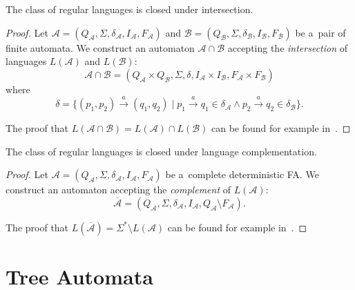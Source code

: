   \begin{theorem}
	 The class of regular languages is closed under intersection.
	\end{theorem}
	
	\begin{proof}
Let $\mathcal{A} = (Q_\mathcal{A}, \Sigma, \delta_\mathcal{A}, I_\mathcal{A},
F_\mathcal{A})$ and $\mathcal{B} = (Q_\mathcal{B}, \Sigma, \delta_\mathcal{B},
I_\mathcal{B}, F_\mathcal{B})$ be a~pair of finite automata. We construct an
automaton $\mathcal{A} \cap \mathcal{B}$ accepting the \emph{intersection} of
languages $L(\mathcal{A})$ and $L(\mathcal{B})$:
\begin{equation}
\mathcal{A} \cap \mathcal{B} = (Q_\mathcal{A} \times
Q_\mathcal{B}, \Sigma, \delta, I_\mathcal{A} \times I_\mathcal{B}, F_\mathcal{A}
\times F_\mathcal{B})
\end{equation} where 
\begin{equation}
\delta = \{(p_1, p_2) \overset{a}{\longrightarrow} (q_1, q_2) \mid p_1
\overset{a}{\longrightarrow} q_1 \in \delta_{\mathcal{A}} \wedge p_2
\overset{a}{\longrightarrow} q_2 \in \delta_{\mathcal{B}}\}.
\end{equation}

\noindent The proof that $L(\mathcal{A} \cap \mathcal{B}) = L(\mathcal{A}) \cap
L(\mathcal{B})$ can be found for example in~\cite{tin}.
\end{proof}
	
 \begin{theorem}
  The class of regular languages is closed under language complementation.
\end{theorem}
	
	\begin{proof}
Let $\mathcal{A} = (Q_\mathcal{A}, \Sigma, \delta_\mathcal{A}, I_\mathcal{A},
F_\mathcal{A})$ be a~complete deterministic FA. We construct an automaton
accepting the \emph{complement} of $L(\mathcal{A})$:
\begin{equation}
\overline{\mathcal{A}} =
(Q_\mathcal{A}, \Sigma, \delta_\mathcal{A}, I_\mathcal{A}, Q_\mathcal{A}
\setminus F_\mathcal{A}).
\end{equation}
	
\noindent The proof that $L(\overline{\mathcal{A}}) = \Sigma^* \setminus
L(\mathcal{A})$ can be found for example in~\cite{tin}.
 \end{proof}

 \section{Tree Automata}

